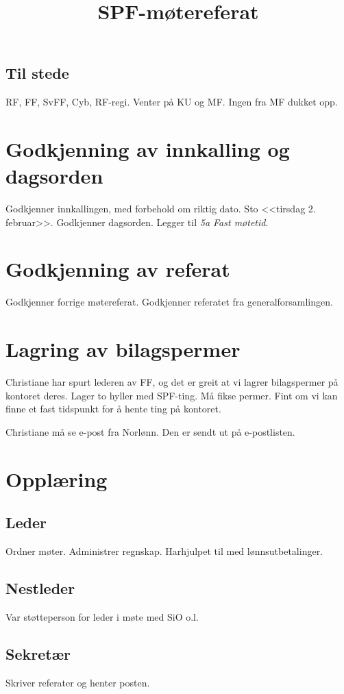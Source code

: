 \documentclass{article}[12pt]
\begin{document}
\title{SPF-møtereferat}
\maketitle

\subsection*{Til stede}
RF, FF, SvFF, Cyb, RF-regi.
Venter på KU og MF.
Ingen fra MF dukket opp.

\section{Godkjenning av innkalling og dagsorden}
Godkjenner innkallingen, med forbehold om riktig dato. 
Sto <<tirsdag 2. februar>>.
Godkjenner dagsorden. Legger til \textit{5a Fast møtetid}.

\section{Godkjenning av referat}
Godkjenner forrige møtereferat.
Godkjenner referatet fra generalforsamlingen.

\section{Lagring av bilagspermer}
Christiane har spurt lederen av FF, og det er greit at vi
lagrer bilagspermer på kontoret deres.
Lager to hyller med SPF-ting. Må fikse permer.
Fint om vi kan finne et fast tidspunkt for å hente ting på kontoret.

Christiane må se e-post fra Norlønn. Den er sendt ut på e-postlisten.
\section{Opplæring}
\subsection{Leder}
Ordner møter. Administrer regnskap. Harhjulpet til med lønnsutbetalinger.
\subsection{Nestleder}
Var støtteperson for leder i møte med SiO  o.l.
\subsection{Sekretær}
Skriver referater og henter posten.
\end{document}
